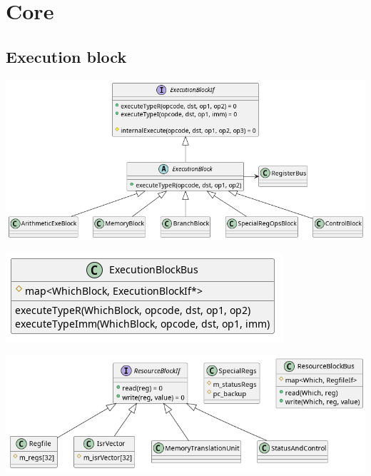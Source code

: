 \documentclass[11pt]{article}
\date{\today}
\title{}
\begin{document}
\tableofcontents

\section{Core}
\label{sec:orgcf1ed51}
\subsection{Execution block}
\label{sec:orgc72a3f5}

\begin{center}
\includegraphics[width=.9\linewidth]{execution-blocks.png}
\end{center}

\begin{center}
\includegraphics[width=.9\linewidth]{execution-block-bus.png}
\end{center}

\begin{center}
\includegraphics[width=.9\linewidth]{register-block.png}
\end{center}
\end{document}
